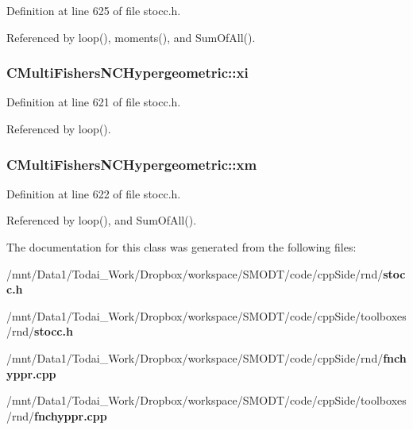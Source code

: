 Definition at line 625 of file stocc.\-h.



Referenced by loop(), moments(), and Sum\-Of\-All().

\subsubsection[{xi}]{ C\-Multi\-Fishers\-N\-C\-Hypergeometric\-::xi\hspace{0.3cm}{\ttfamily [protected]}}\label{class_c_multi_fishers_n_c_hypergeometric_a23d898d3b688be52155f9de80dd5da8b}


Definition at line 621 of file stocc.\-h.



Referenced by loop().

\subsubsection[{xm}]{ C\-Multi\-Fishers\-N\-C\-Hypergeometric\-::xm\hspace{0.3cm}{\ttfamily [protected]}}\label{class_c_multi_fishers_n_c_hypergeometric_aa58081ebff0e6e273abd70f36aebc58c}


Definition at line 622 of file stocc.\-h.



Referenced by loop(), and Sum\-Of\-All().



The documentation for this class was generated from the following files\-:\begin{DoxyCompactItemize}
\item 
/mnt/\-Data1/\-Todai\-\_\-\-Work/\-Dropbox/workspace/\-S\-M\-O\-D\-T/code/cpp\-Side/rnd/{\bf stocc.\-h}\item 
/mnt/\-Data1/\-Todai\-\_\-\-Work/\-Dropbox/workspace/\-S\-M\-O\-D\-T/code/cpp\-Side/toolboxes/rnd/{\bf stocc.\-h}\item 
/mnt/\-Data1/\-Todai\-\_\-\-Work/\-Dropbox/workspace/\-S\-M\-O\-D\-T/code/cpp\-Side/rnd/{\bf fnchyppr.\-cpp}\item 
/mnt/\-Data1/\-Todai\-\_\-\-Work/\-Dropbox/workspace/\-S\-M\-O\-D\-T/code/cpp\-Side/toolboxes/rnd/{\bf fnchyppr.\-cpp}\end{DoxyCompactItemize}
